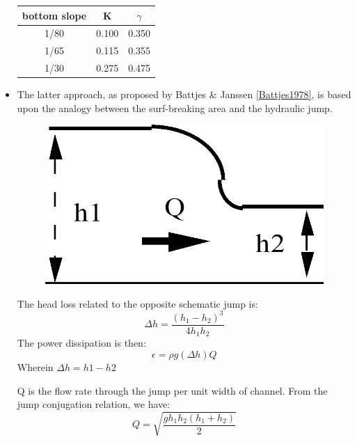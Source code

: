 \begin{itemize}
    \begin{tabular}{|c|c|c|}
      \hline
      bottom slope & K & $\gamma$ \\ \hline
      1/80 & 0.100 & 0.350 \\ \hline
      1/65 & 0.115 & 0.355 \\ \hline
      1/30 & 0.275 & 0.475 \\ \hline
    \end{tabular}

\item  The latter approach, as proposed by Battjes \& Janssen
  \eqref{Battjes1978}, is based upon the analogy between the surf-breaking area
    and the hydraulic jump.

    \begin{minipage}[b]{0.4\textwidth}
      \begin{figure}[H]%
        \centering
        \includegraphics[width=\textwidth]{./graphics/jump}
      \end{figure}
    \end{minipage}%
    \begin{minipage}[b]{0.4\textwidth}
The head loss related to the opposite schematic jump is:
    \begin{equation}
      \Delta h = \frac{(h_{1}-h_{2})^{3}}{4h_{1}h_{2}}
      \label{eq:3.42}
    \end{equation}
The power dissipation is then:
\[ \epsilon = \rho g(\Delta h)Q  \]
Wherein $\Delta{h}=h1-h2$ \\
\end{minipage}

Q is the flow rate through the jump per unit width of channel. From the jump
conjugation relation, we have:
\begin{equation}
  Q = \sqrt{\frac{gh_{1}h_{2}(h_{1}+h_{2})}{2}}
  \label{eq:3.43}
\end{equation}


\end{itemize}
